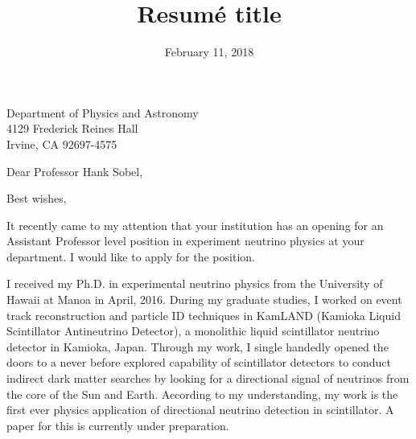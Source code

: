 \documentclass[10pt,a4paper,sans]{moderncv}        %
\title{Resumé title}                               %
\begin{document}
{Department of Physics and Astronomy\\
4129 Frederick Reines Hall\\
Irvine, CA 92697-4575}
\date{February 11, 2018}
\opening{Dear Professor Hank Sobel,}
\closing{Best wishes,}
\makelettertitle

It recently came to my attention that your institution has an opening for an
Assistant Professor level position in experiment neutrino physics at your
department. I would like to apply for the position.

I received my Ph.D. in experimental neutrino physics from the University of
Hawaii at Manoa in April, 2016. During my graduate studies, I worked on event
track reconstruction and particle ID techniques in KamLAND (Kamioka Liquid
Scintillator Antineutrino Detector), a monolithic liquid scintillator neutrino
detector in Kamioka, Japan. Through my work, I single handedly opened the doors
to a never before explored capability of scintillator detectors to conduct
indirect dark matter searches by looking for a directional signal of neutrinos
from the core of the Sun and Earth. According to my understanding, my work is
the first ever physics application of directional neutrino detection in
scintillator. A paper for this is currently under preparation.

\end{document}
